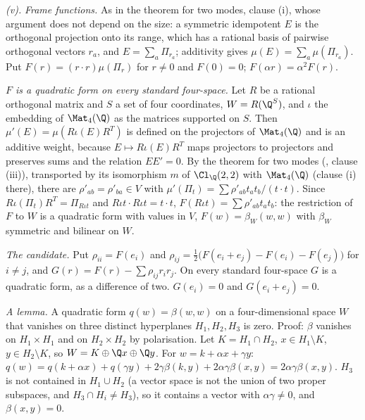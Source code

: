 \emph{(v).} \emph{Frame functions.} As in the theorem for two modes, clause (i), whose argument does not depend on the size: a symmetric idempotent $E$ is the orthogonal projection onto its range, which has a rational basis of pairwise orthogonal vectors $r_{a}$, and $E = \sum_{a}\Pi_{r_{a}}$; additivity gives $\mu(E) = \sum_{a}\mu(\Pi_{r_{a}})$. Put $F(r) = (r \cdot r)\mu(\Pi_{r})$ for $r \ne 0$ and $F(0) = 0$; $F(\alpha r) = \alpha^{2}F(r)$.

\emph{$F$ is a quadratic form on every standard four-space.} Let $R$ be a rational orthogonal matrix and $S$ a set of four coordinates, $W = R(\Q^{S})$, and $\iota$ the embedding of $\Mat_{4}(\Q)$ as the matrices supported on $S$. Then $\mu'(E) = \mu(R\iota(E)R^{T})$ is defined on the projectors of $\Mat_{4}(\Q)$ and is an additive weight, because $E \mapsto R\iota(E)R^{T}$ maps projectors to projectors and preserves sums and the relation $EE' = 0$. By the theorem for two modes (, clause (iii)), transported by its isomorphism $m$ of $\Cl_{\Q}(2,2)$ with $\Mat_{4}(\Q)$ (clause (i) there), there are $\rho'_{ab} = \rho'_{ba} \in V$ with $\mu'(\Pi_{t}) = \sum\rho'_{ab}t_{a}t_{b}/(t \cdot t)$. Since $R\iota(\Pi_{t})R^{T} = \Pi_{R\iota t}$ and $R\iota t \cdot R\iota t = t \cdot t$, $F(R\iota t) = \sum\rho'_{ab}t_{a}t_{b}$: the restriction of $F$ to $W$ is a quadratic form with values in $V$, $F(w) = \beta_{W}(w,w)$ with $\beta_{W}$ symmetric and bilinear on $W$.

\emph{The candidate.} Put $\rho_{ii} = F(e_{i})$ and $\rho_{ij} = \tfrac12\bigl(F(e_{i} + e_{j}) - F(e_{i}) - F(e_{j})\bigr)$ for $i \ne j$, and $G(r) = F(r) - \sum\rho_{ij}r_{i}r_{j}$. On every standard four-space $G$ is a quadratic form, as a difference of two. $G(e_{i}) = 0$ and $G(e_{i} + e_{j}) = 0$.

\emph{A lemma.} A quadratic form $q(w) = \beta(w,w)$ on a four-dimensional space $W$ that vanishes on three distinct hyperplanes $H_{1}, H_{2}, H_{3}$ is zero. Proof: $\beta$ vanishes on $H_{1} \times H_{1}$ and on $H_{2} \times H_{2}$ by polarisation. Let $K = H_{1} \cap H_{2}$, $x \in H_{1} \setminus K$, $y \in H_{2} \setminus K$, so $W = K \oplus \Q x \oplus \Q y$. For $w = k + \alpha x + \gamma y$: $q(w) = q(k + \alpha x) + q(\gamma y) + 2\gamma\beta(k,y) + 2\alpha\gamma\beta(x,y) = 2\alpha\gamma\beta(x,y)$. $H_{3}$ is not contained in $H_{1} \cup H_{2}$ (a vector space is not the union of two proper subspaces, and $H_{3} \cap H_{i} \ne H_{3}$), so it contains a vector with $\alpha\gamma \ne 0$, and $\beta(x,y) = 0$.

